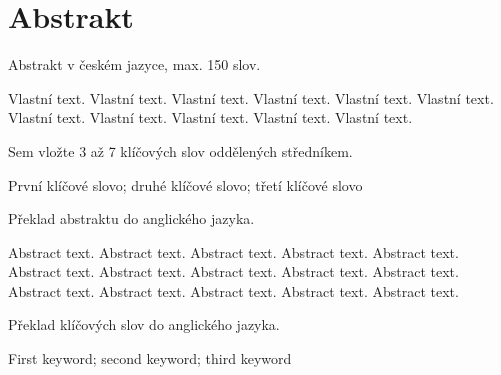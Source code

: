 \chapter*{Abstrakt}

{\color{infoBlue}
Abstrakt v českém jazyce, max. 150 slov.
}

Vlastní text. Vlastní text. Vlastní text. Vlastní text. Vlastní text. Vlastní text. Vlastní text. Vlastní text. Vlastní text. Vlastní text. Vlastní text.


{\color{infoBlue}
Sem vložte 3 až 7 klíčových slov oddělených středníkem.
}

První klíčové slovo; druhé klíčové slovo; třetí klíčové slovo

\vspace{21.5pt}  %


{\color{infoBlue}
Překlad abstraktu do anglického jazyka.
}

Abstract text. Abstract text. Abstract text. Abstract text. Abstract text. Abstract text. Abstract text. Abstract text. Abstract text. Abstract text. Abstract text. Abstract text. Abstract text. Abstract text. Abstract text.


{\color{infoBlue}
Překlad klíčových slov do anglického jazyka.
}

First keyword; second keyword; third keyword

\pagebreak

